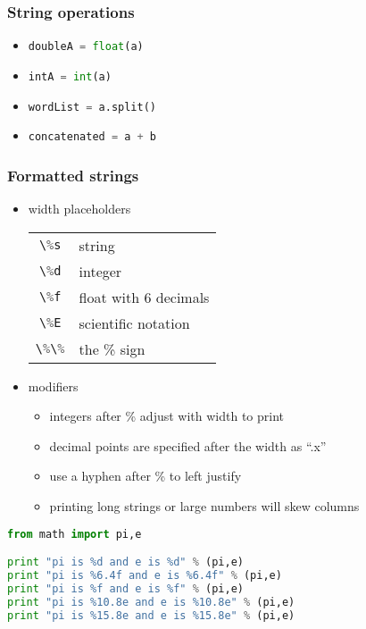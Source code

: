 \documentclass[xcolor=table,10pt,final]{beamer}
\begin{document}
\begin{frame}
  \frametitle{String operations}
  \begin{itemize}
    \item \lstinline[language=Python]|doubleA = float(a)|
    \item \lstinline[language=Python]|intA = int(a)|
    \item \lstinline[language=Python]|wordList = a.split()|
    \item \lstinline[language=Python]|concatenated = a + b|
  \end{itemize}
\end{frame}

\begin{frame}[fragile]
  \frametitle{Formatted strings}
  \begin{itemize}
    \item width placeholders
      \begin{table}
        \begin{tabular}{cl}
          \lstinline[language=Python]|\%s| & string\\
          \lstinline[language=Python]|\%d| & integer\\
          \lstinline[language=Python]|\%f| & float with 6 decimals\\
          \lstinline[language=Python]|\%E| & scientific notation\\
          \lstinline[language=Python]|\%\%| & the \% sign
        \end{tabular}
      \end{table}
    \item modifiers
      \begin{itemize}
        \item integers after \% adjust with width to print
        \item decimal points are specified after the width as ``.x''
        \item use a hyphen after \% to left justify
        \item printing long strings or large numbers will skew columns
      \end{itemize}
  \end{itemize}
  \begin{lstlisting}[language=Python]
from math import pi,e

print "pi is %d and e is %d" % (pi,e)
print "pi is %6.4f and e is %6.4f" % (pi,e)
print "pi is %f and e is %f" % (pi,e)
print "pi is %10.8e and e is %10.8e" % (pi,e)
print "pi is %15.8e and e is %15.8e" % (pi,e)
\end{lstlisting}
\end{frame}
\end{document}
